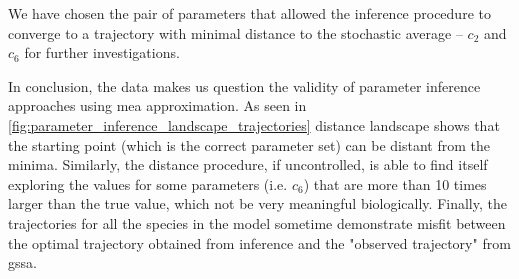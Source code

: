 We have chosen the pair of parameters that allowed the inference procedure to converge to a trajectory with minimal distance to the stochastic average -- $c_2$ and $c_6$ for further investigations.
 

In conclusion, the data makes us question the validity of parameter inference approaches using \gls{mea} approximation.
As seen in \autoref{fig:parameter_inference_landscape_trajectories} distance landscape shows that the starting point (which is the correct parameter set) can be distant from the minima. Similarly, the distance procedure, if uncontrolled, is able to find itself exploring the values for some parameters (i.e. $c_6$) that are more than 10 times larger than the true value, which not be very meaningful biologically.
Finally, the trajectories for all the species in the \pft{} model sometime demonstrate misfit between the optimal trajectory obtained from inference and the "observed trajectory" from \gls{gssa}. 

